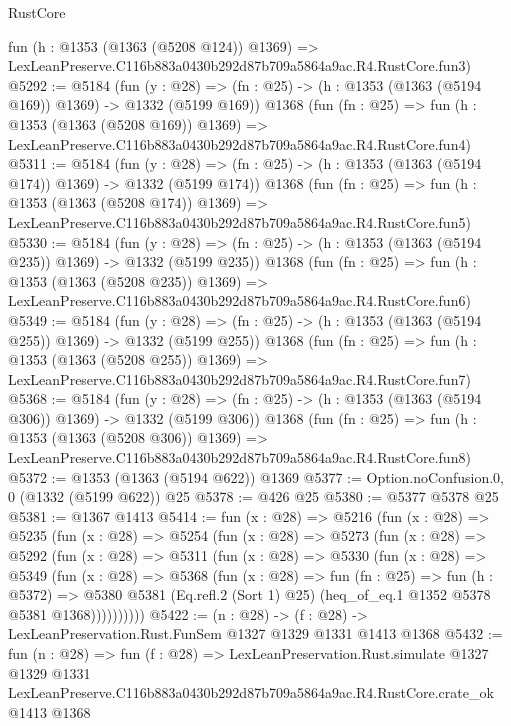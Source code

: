\begin{lexlean}{RustCore}
\begin{coremodule}
    fun (h : @1353 (@1363 (@5208 @124)) @1369) =>
    LexLeanPreserve.C116b883a0430b292d87b709a5864a9ac.R4.RustCore.fun3)
@5292 := @5184
    (fun (y : @28) => (fn : @25) -> (h : @1353 (@1363 (@5194 @169)) @1369) -> @1332 (@5199 @169))
    @1368
    (fun (fn : @25) =>
    fun (h : @1353 (@1363 (@5208 @169)) @1369) =>
    LexLeanPreserve.C116b883a0430b292d87b709a5864a9ac.R4.RustCore.fun4)
@5311 := @5184
    (fun (y : @28) => (fn : @25) -> (h : @1353 (@1363 (@5194 @174)) @1369) -> @1332 (@5199 @174))
    @1368
    (fun (fn : @25) =>
    fun (h : @1353 (@1363 (@5208 @174)) @1369) =>
    LexLeanPreserve.C116b883a0430b292d87b709a5864a9ac.R4.RustCore.fun5)
@5330 := @5184
    (fun (y : @28) => (fn : @25) -> (h : @1353 (@1363 (@5194 @235)) @1369) -> @1332 (@5199 @235))
    @1368
    (fun (fn : @25) =>
    fun (h : @1353 (@1363 (@5208 @235)) @1369) =>
    LexLeanPreserve.C116b883a0430b292d87b709a5864a9ac.R4.RustCore.fun6)
@5349 := @5184
    (fun (y : @28) => (fn : @25) -> (h : @1353 (@1363 (@5194 @255)) @1369) -> @1332 (@5199 @255))
    @1368
    (fun (fn : @25) =>
    fun (h : @1353 (@1363 (@5208 @255)) @1369) =>
    LexLeanPreserve.C116b883a0430b292d87b709a5864a9ac.R4.RustCore.fun7)
@5368 := @5184
    (fun (y : @28) => (fn : @25) -> (h : @1353 (@1363 (@5194 @306)) @1369) -> @1332 (@5199 @306))
    @1368
    (fun (fn : @25) =>
    fun (h : @1353 (@1363 (@5208 @306)) @1369) =>
    LexLeanPreserve.C116b883a0430b292d87b709a5864a9ac.R4.RustCore.fun8)
@5372 := @1353 (@1363 (@5194 @622)) @1369
@5377 := Option.noConfusion.{0, 0} (@1332 (@5199 @622)) @25
@5378 := @426 @25
@5380 := @5377 @5378 @25
@5381 := @1367 @1413
@5414 := fun (x : @28) =>
  @5216
    (fun (x : @28) =>
    @5235
      (fun (x : @28) =>
      @5254
        (fun (x : @28) =>
        @5273
          (fun (x : @28) =>
          @5292
            (fun (x : @28) =>
            @5311
              (fun (x : @28) =>
              @5330
                (fun (x : @28) =>
                @5349
                  (fun (x : @28) =>
                  @5368
                    (fun (x : @28) =>
                    fun (fn : @25) =>
                    fun (h : @5372) =>
                    @5380
                      @5381
                      (Eq.refl.{2} (Sort 1) @25)
                      (heq_of_eq.{1} @1352 @5378 @5381 @1368))))))))))
@5422 := (n : @28) -> (f : @28) -> LexLeanPreservation.Rust.FunSem @1327 @1329 @1331 @1413 @1368
@5432 := fun (n : @28) =>
  fun (f : @28) =>
  LexLeanPreservation.Rust.simulate
    @1327
    @1329
    @1331
    LexLeanPreserve.C116b883a0430b292d87b709a5864a9ac.R4.RustCore.crate_ok
    @1413
    @1368
\end{coremodule}
\end{lexlean}
